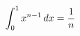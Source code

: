 \documentclass[preview]{standalone}
\begin{document}
\begin{align*}
\special{dvisvgm:raw <g id='unique000'>}\int_0^1x^{n-1}\,dx=\frac1n\special{dvisvgm:raw </g>}
\end{align*}
\end{document}
